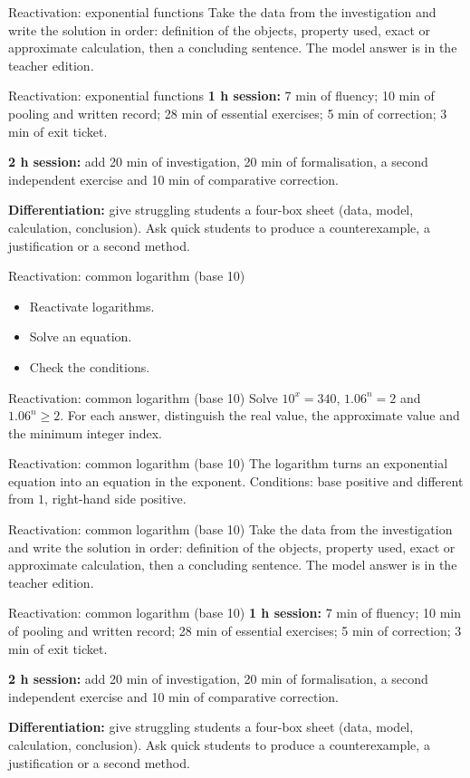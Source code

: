 \documentclass[aspectratio=169,10pt]{beamer}
\begin{document}
\begin{frame}{Reactivation: exponential functions}
Take the data from the investigation and write the solution in order: definition of the objects, property used, exact or approximate calculation, then a concluding sentence. The model answer is in the teacher edition.
\end{frame}
\begin{frame}{Reactivation: exponential functions}
\textbf{1 h session:} 7 min of fluency; 10 min of pooling and written record; 28 min of essential exercises; 5 min of correction; 3 min of exit ticket.

\textbf{2 h session:} add 20 min of investigation, 20 min of formalisation, a second independent exercise and 10 min of comparative correction.

\textbf{Differentiation:} give struggling students a four-box sheet (data, model, calculation, conclusion). Ask quick students to produce a counterexample, a justification or a second method.
\end{frame}
\begin{frame}{Reactivation: common logarithm (base 10)}
\begin{itemize}
\item Reactivate logarithms.
\item Solve an equation.
\item Check the conditions.

\end{itemize}
\end{frame}
\begin{frame}{Reactivation: common logarithm (base 10)}
Solve \(10^x=340\), \(1.06^n=2\) and \(1.06^n\geq2\). For each answer, distinguish the real value, the approximate value and the minimum integer index.
\end{frame}
\begin{frame}{Reactivation: common logarithm (base 10)}
The logarithm turns an exponential equation into an equation in the exponent. Conditions: base positive and different from \(1\), right-hand side positive.
\end{frame}
\begin{frame}{Reactivation: common logarithm (base 10)}
Take the data from the investigation and write the solution in order: definition of the objects, property used, exact or approximate calculation, then a concluding sentence. The model answer is in the teacher edition.
\end{frame}
\begin{frame}{Reactivation: common logarithm (base 10)}
\textbf{1 h session:} 7 min of fluency; 10 min of pooling and written record; 28 min of essential exercises; 5 min of correction; 3 min of exit ticket.

\textbf{2 h session:} add 20 min of investigation, 20 min of formalisation, a second independent exercise and 10 min of comparative correction.

\textbf{Differentiation:} give struggling students a four-box sheet (data, model, calculation, conclusion). Ask quick students to produce a counterexample, a justification or a second method.
\end{frame}
\end{document}
